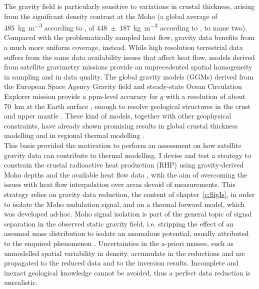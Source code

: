 The gravity field is particularly sensitive to variations in crustal thickness, arising from the significant density contrast at the Moho (a global average of \SI{485}{\kilo \gram \per \cubic \metre} according to \cite{Tenzer2012contrast}, of \num{448}~$\pm$~\SI{187}{\kilo \gram \per \cubic \metre} according to \cite{Sjoberg2011}, to name two).
Compared with the problematically sampled heat flow, gravity data benefits from a much more uniform coverage, instead.
While high resolution terrestrial data suffers from the same data availability issues that affect heat flow, models derived from satellite gravimetry missions provide an unprecedented spatial homogeneity in sampling and in data quality.
The global gravity models (GGMs) derived from the European Space Agency Gravity field and steady-state Ocean Circulation Explorer mission \parencite[GOCE,][]{Floberghagen2011_goce} provide a ppm-level accuracy for $g$ with a resolution of about \SI{70}{\kilo \metre} at the Earth surface \parencites{Brockmann2014}{Kvas_GOCO06s_dataset}, enough to resolve geological structures in the crust and upper mantle \parencite{Peral2018}.
These kind of models, together with other geophysical constraints, have already shown promising results in global crustal thickness modelling \parencites[e.g.][]{Eshagh2011}{Reguzzoni2015} and in regional thermal modelling \parencite{Bouman2015}.
\\

This basis provided the motivation to perform an assessment on how satellite gravity data can contribute to thermal modelling.
I devise and test a strategy to constrain the crustal radioactive heat production (RHP) using gravity-derived Moho depths and the available heat flow data \parencite{globalHF}, with the aim of overcoming the issues with heat flow interpolation over areas devoid of measurements.
This strategy relies on gravity data reduction, the content of chapter~\ref{c:SigIs}, in order to isolate the Moho undulation signal, and on a thermal forward model, which was developed ad-hoc.
Moho signal isolation is part of the general topic of signal separation in the observed static gravity field, i.e. stripping the effect of an assumed mass distribution to isolate an anomalous potential, usually attributed to the enquired phenomenon \parencites{Mikuska2007}{Sjoberg2013}{Aitken2015}[][, to name a few]{Tenzer2019}.
Uncertainties in the a-priori masses, such as unmodelled spatial variability in density, accumulate in the reductions and are propagated to the reduced data and to the inversion results.
Incomplete and inexact geological knowledge cannot be avoided, thus a perfect data reduction is unrealistic.

